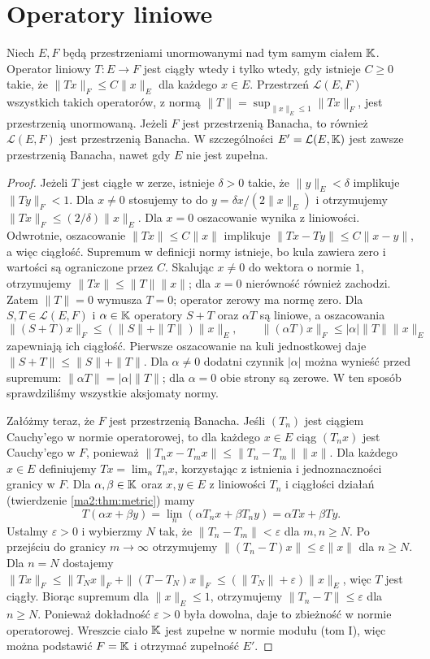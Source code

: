 \section{Operatory liniowe}
\begin{stwierdzenie}
\label{prop:operator-norm12}
Niech $E,F$ będą przestrzeniami unormowanymi nad tym samym
ciałem $\mathbb K$. Operator liniowy $T:E\to F$ jest ciągły wtedy
i tylko wtedy, gdy istnieje $C\ge0$ takie, że
$\|Tx\|_F\le C\|x\|_E$ dla każdego $x\in E$.
Przestrzeń $\mathcal L(E,F)$ wszystkich takich operatorów,
z normą $\|T\|=\sup_{\|x\|_E\le1}\|Tx\|_F$, jest przestrzenią
unormowaną. Jeżeli $F$ jest przestrzenią Banacha, to również
$\mathcal L(E,F)$ jest przestrzenią Banacha.
W szczególności $E'=\mathcal L(E,\mathbb K)$ jest zawsze przestrzenią
Banacha, nawet gdy $E$ nie jest zupełna.
\end{stwierdzenie}
\begin{proof}
Jeżeli $T$ jest ciągłe w zerze, istnieje $\delta>0$ takie,
że $\|y\|_E<\delta$ implikuje $\|Ty\|_F<1$.
Dla $x\ne0$ stosujemy to do $y=\delta x/(2\|x\|_E)$
i otrzymujemy $\|Tx\|_F\le(2/\delta)\|x\|_E$.
Dla $x=0$ oszacowanie wynika z liniowości.
Odwrotnie, oszacowanie $\|Tx\|\le C\|x\|$ implikuje
$\|Tx-Ty\|\le C\|x-y\|$, a więc ciągłość.
Supremum w definicji normy istnieje, bo kula zawiera zero
i wartości są ograniczone przez $C$. Skalując $x\ne0$
do wektora o normie $1$, otrzymujemy $\|Tx\|\le\|T\|\|x\|$;
dla $x=0$ nierówność również zachodzi.
Zatem $\|T\|=0$ wymusza $T=0$; operator zerowy ma normę zero.
Dla $S,T\in\mathcal L(E,F)$ i $\alpha\in\mathbb K$ operatory $S+T$
oraz $\alpha T$ są liniowe, a oszacowania
\[
 \|(S+T)x\|_F\le(\|S\|+\|T\|)\|x\|_E,\qquad
 \|(\alpha T)x\|_F\le|\alpha|\|T\|\|x\|_E
\]
zapewniają ich ciągłość. Pierwsze oszacowanie na kuli jednostkowej
daje $\|S+T\|\le\|S\|+\|T\|$. Dla $\alpha\ne0$ dodatni
czynnik $|\alpha|$ można wynieść przed supremum:
$\|\alpha T\|=|\alpha|\|T\|$; dla $\alpha=0$ obie strony
są zerowe. W ten sposób sprawdziliśmy wszystkie aksjomaty normy.

Załóżmy teraz, że $F$ jest przestrzenią Banacha.
Jeśli $(T_n)$ jest ciągiem Cauchy'ego w normie operatorowej,
to dla każdego $x\in E$ ciąg $(T_nx)$ jest Cauchy'ego w $F$, ponieważ
$\|T_nx-T_mx\|\le\|T_n-T_m\|\|x\|$.
Dla każdego $x\in E$ definiujemy $Tx=\lim_nT_nx$,
korzystając z istnienia i jednoznaczności granicy w $F$.
Dla $\alpha,\beta\in\mathbb K$ oraz $x,y\in E$ z liniowości $T_n$
i ciągłości działań (twierdzenie \ref{ma2:thm:metric}) mamy
\[
 T(\alpha x+\beta y)=\lim_n(\alpha T_nx+\beta T_ny)
 =\alpha Tx+\beta Ty.
\]
Ustalmy
$\varepsilon>0$ i wybierzmy $N$ tak, że
$\|T_n-T_m\|<\varepsilon$ dla $m,n\ge N$.
Po przejściu do granicy $m\to\infty$ otrzymujemy
$\|(T_n-T)x\|\le\varepsilon\|x\|$ dla $n\ge N$.
Dla $n=N$ dostajemy
$\|Tx\|_F\le\|T_Nx\|_F+\|(T-T_N)x\|_F
\le(\|T_N\|+\varepsilon)\|x\|_E$,
więc $T$ jest ciągły. Biorąc supremum dla $\|x\|_E\le1$,
otrzymujemy $\|T_n-T\|\le\varepsilon$ dla $n\ge N$.
Ponieważ dokładność $\varepsilon>0$ była dowolna, daje to
zbieżność w normie operatorowej. Wreszcie ciało $\mathbb K$ jest
zupełne w normie modułu (tom I), więc można podstawić
$F=\mathbb K$ i otrzymać zupełność $E'$.
\end{proof}

